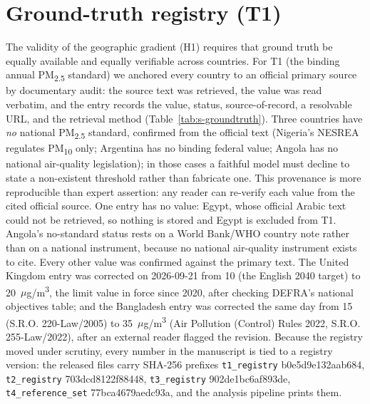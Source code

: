 \documentclass[11pt,a4paper]{article}
\begin{document}


\section{Ground-truth registry (T1)}

The validity of the geographic gradient (H1) requires that ground truth be
equally available and equally verifiable across countries. For T1 (the binding
annual PM\textsubscript{2.5} standard) we anchored every country to an official
primary source by documentary audit: the source text was retrieved, the value was
read verbatim, and the entry records the value, status, source-of-record, a
resolvable URL, and the retrieval method (Table~\ref{tab:s-groundtruth}). Three
countries have \emph{no} national PM\textsubscript{2.5} standard, confirmed from
the official text (Nigeria's NESREA regulates PM\textsubscript{10} only; Argentina
has no binding federal value; Angola has no national air-quality legislation); in
those cases a faithful model must decline to state a non-existent threshold rather
than fabricate one. This provenance is more reproducible than expert assertion:
any reader can re-verify each value from the cited official source. One entry has no
value: Egypt, whose official Arabic text could not be retrieved, so nothing is
stored and Egypt is excluded from T1. Angola's no-standard status rests
on a World Bank/WHO country note rather than on a national instrument, because no
national air-quality instrument exists to cite. Every other value was confirmed
against the primary text. The United Kingdom entry was corrected on 2026-09-21
from 10 (the English 2040 target) to 20~$\mu$g/m\textsuperscript{3}, the limit
value in force since 2020, after checking DEFRA's national objectives table; and
the Bangladesh entry was corrected the same day from 15 (S.R.O. 220-Law/2005) to
35~$\mu$g/m\textsuperscript{3} (Air Pollution (Control) Rules 2022, S.R.O.
255-Law/2022), after an external reader flagged the revision. Because the
registry moved under scrutiny, every number in the manuscript is tied to a
registry version: the released files carry SHA-256 prefixes
\texttt{t1\_registry} b0e5d9e132aab684, \texttt{t2\_registry} 703dcd8122f88448, \texttt{t3\_registry} 902de1bc6af893de,
\texttt{t4\_reference\_set} 77bca4679aedc93a, and the analysis pipeline prints them.


\end{document}
